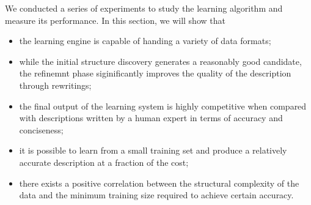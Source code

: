 %

We conducted a series of experiments to study the learning algorithm
and measure its performance. In this section, we will show that
\begin{itemize}
\item the learning engine is capable of handing a variety of data formats;
\item while the initial structure discovery generates a reasonably
good candidate, the refinemnt phase siginificantly improves the
quality of the description through rewritings; 
\item the final output of the learning system is highly competitive
when compared with descriptions written by a human expert 
in terms of accuracy and conciseness; 
\item it is possible to learn from a small training set and produce
a relatively accurate description at a fraction of the cost;
\item there exists a positive correlation between the structural complexity
of the data and the minimum training size required to achieve certain
accuracy.
\end{itemize}

